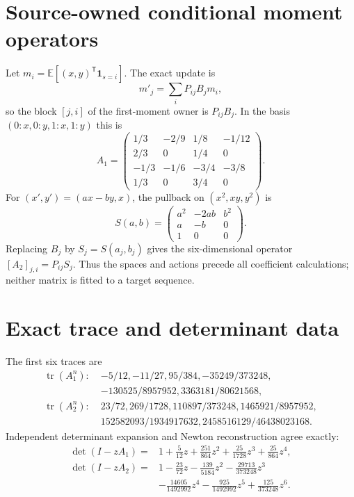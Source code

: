 \documentclass[10pt]{article}
\begin{document}
\section{Source-owned conditional moment operators}
Let $m_i=\mathbb E[(x,y)^\mathsf T\mathbf1_{s=i}]$.  The exact update is
\[
 m'_j=\sum_iP_{ij}B_jm_i,
 \]
so the block $[j,i]$ of the first-moment owner is $P_{ij}B_j$.  In the
basis $(0{:}x,0{:}y,1{:}x,1{:}y)$ this is
\[
 A_1=\begin{pmatrix}
 1/3&-2/9&1/8&-1/12\\2/3&0&1/4&0\\
 -1/3&-1/6&-3/4&-3/8\\1/3&0&3/4&0
 \end{pmatrix}.
\]
For $(x',y')=(ax-by,x)$, the pullback on $(x^2,xy,y^2)$ is
\[
 S(a,b)=\begin{pmatrix}a^2&-2ab&b^2\\a&-b&0\\1&0&0\end{pmatrix}.
\]
Replacing $B_j$ by $S_j=S(a_j,b_j)$ gives the six-dimensional operator
$[A_2]_{j,i}=P_{ij}S_j$.  Thus the spaces and actions precede all coefficient
calculations; neither matrix is fitted to a target sequence.

\section{Exact trace and determinant data}
The first six traces are
\begin{align*}
 \operatorname{tr}(A_1^n):\;&-5/12,-11/27,95/384,
 -35249/373248,\\[-2pt]
 &-130525/8957952,3363181/80621568,\\
 \operatorname{tr}(A_2^n):\;&23/72,269/1728,110897/373248,
 1465921/8957952,\\[-2pt]
 &152582093/1934917632,2458516129/46438023168.
\end{align*}
Independent determinant expansion and Newton reconstruction agree exactly:
\begin{align*}
 \det(I-zA_1)={}&1+\tfrac5{12}z+\tfrac{251}{864}z^2
 +\tfrac{25}{1728}z^3+\tfrac{25}{864}z^4,\\
 \det(I-zA_2)={}&1-\tfrac{23}{72}z-\tfrac{139}{5184}z^2
 -\tfrac{29713}{373248}z^3\\
 &-\tfrac{14605}{1492992}z^4-\tfrac{925}{1492992}z^5
 +\tfrac{125}{373248}z^6.
\end{align*}
\end{document}
